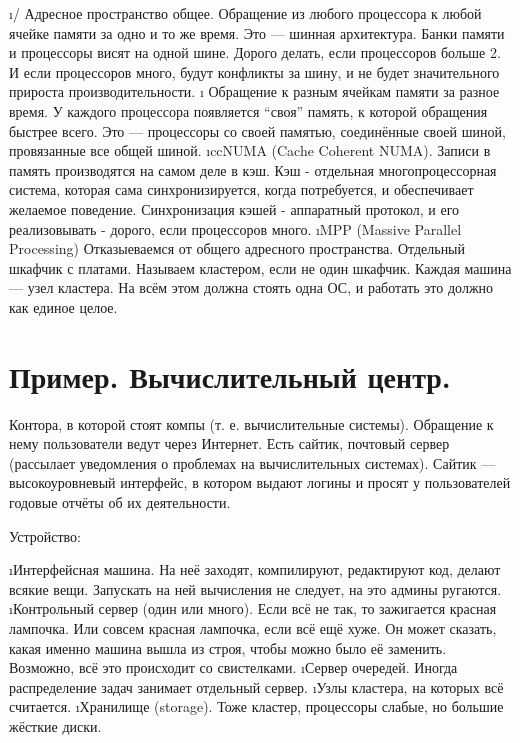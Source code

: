  \begin{enumerate}
  \i {}/
   Адресное пространство общее. Обращение из любого процессора к любой ячейке памяти за одно и то же время.
   Это --- шинная архитектура. Банки памяти и процессоры висят на одной шине. Дорого делать, если процессоров больше 2. И если процессоров много, будут конфликты за шину, и не будет значительного прироста производительности.
  \i {}
   Обращение к разным ячейкам памяти за разное время. У каждого процессора появляется ``своя'' память, к которой обращения быстрее всего. 
   Это --- процессоры со своей памятью, соединённые своей шиной, провязанные все общей шиной.
  \i ccNUMA (Cache Coherent NUMA). Записи в память производятся на самом деле в кэш. Кэш - отдельная многопроцессорная система, которая сама синхронизируется, когда потребуется, и обеспечивает желаемое поведение.
   Синхронизация кэшей - аппаратный протокол, и его реализовывать - дорого, если процессоров много.
  \i MPP (Massive Parallel Processing) Отказыеваемся от общего адресного пространства. Отдельный шкафчик с платами.
   Называем кластером, если не один шкафчик. Каждая машина --- узел кластера. 
   На всём этом должна стоять одна ОС, и работать это должно как единое целое.
 \end{enumerate}
 
 \section{Пример. Вычислительный центр.}
 Контора, в которой стоят компы (т. е. вычислительные системы). Обращение к нему пользователи ведут через Интернет. Есть сайтик, почтовый сервер (рассылает уведомления о проблемах на вычислительных системах). Сайтик --- высокоуровневый интерфейс, в котором выдают логины и просят у пользователей годовые отчёты об их деятельности. 
 
 Устройство:
 \begin{enumerate}
  \i Интерфейсная машина. На неё заходят, компилируют, редактируют код, делают всякие вещи. Запускать на ней вычисления не следует, на это админы ругаются.
  \i Контрольный сервер (один или много). Если всё не так, то зажигается красная лампочка. Или совсем красная лампочка, если всё ещё хуже. Он может сказать, какая именно машина вышла из строя, чтобы можно было её заменить. Возможно, всё это происходит со свистелками.
  \i Сервер очередей. Иногда распределение задач занимает отдельный сервер.
  \i Узлы кластера, на которых всё считается.
  \i Хранилище (storage). Тоже кластер, процессоры слабые, но большие жёсткие диски.
 \end{enumerate}

